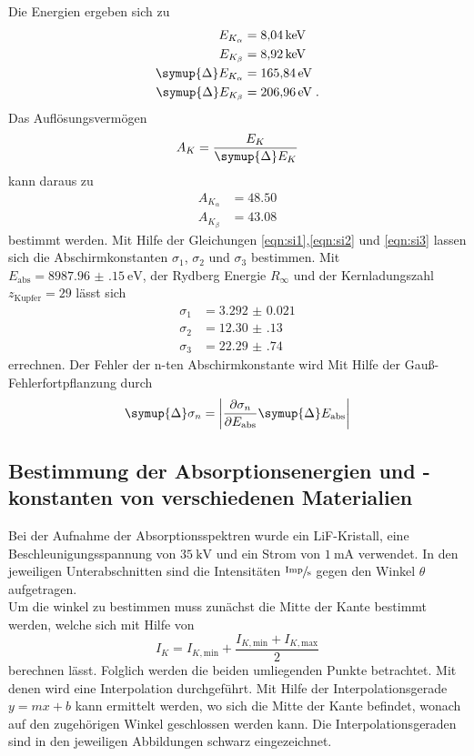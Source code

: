 Die Energien ergeben sich zu 
\begin{align*}
    E_{K_\alpha} & =  \SI{8.04}{\kilo\electronvolt} \\
    E_{K_\beta}  & =  \SI{8.92}{\kilo\electronvolt} \\
    \symup{\Delta}E_{K_\alpha} &= \SI{165.84}{\electronvolt} \\
    \symup{\Delta}E_{K_\beta}  &= \SI{206.96}{\electronvolt} \; \text{.}
\end{align*}
Das Auflösungsvermögen 
\begin{equation}
    A_K = \frac{E_K}{\symup{\Delta}E_K}
\end{equation}
kann daraus zu 
\begin{align*}
    A_{K_\alpha}&= \num{48.50} \\
    A_{K_\beta} &= \num{43.08}
\end{align*}
bestimmt werden.
Mit Hilfe der Gleichungen \eqref{eqn:si1},\eqref{eqn:si2} und \eqref{eqn:si3} lassen sich die Abschirmkonstanten $\sigma_1$, $\sigma_2$ und $\sigma_3$ bestimmen.
Mit $E_\text{abs} = \SI{8987.96(15)}{\electronvolt}$\cite{eabs}, der Rydberg Energie $R_\infty$ und der Kernladungszahl
$z_\text{Kupfer} = 29 $ lässt sich
\begin{align*}
    \sigma_1 &= \num{3.292(21)}  \\
    \sigma_2 &= \num{12.30(13)}  \\
    \sigma_3 &= \num{22.29(74)}
\end{align*}
errechnen.
Der Fehler der n-ten Abschirmkonstante wird Mit Hilfe der Gauß-Fehlerfortpflanzung durch
\begin{equation}
    \symup{\Delta} \sigma_n = \left | \frac{\partial \sigma_n}{\partial E_\text{abs} } \symup{\Delta} E_\text{abs} \right | 
\end{equation} 
\subsection{Bestimmung der Absorptionsenergien und -konstanten von verschiedenen Materialien}
Bei der Aufnahme der Absorptionsspektren wurde ein LiF-Kristall, eine Beschleunigungsspannung von $\SI{35}{\kilo\volt}$ und ein Strom von $\SI{1}{\milli\ampere}$
verwendet. 
In den jeweiligen Unterabschnitten sind die Intensitäten $\sfrac{\text{Imp}}{\si{\second}}$ gegen den Winkel $\theta$ aufgetragen. \\
Um die winkel zu bestimmen muss zunächst die Mitte der Kante bestimmt werden, welche sich mit Hilfe von
\begin{equation}
    I_K = I_{K, \text{min}} + \frac{I_{K, \text{min}} + I_{K, \text{max}}}{2}
\end{equation}
berechnen lässt. 
Folglich werden die beiden umliegenden Punkte betrachtet. 
Mit denen wird eine Interpolation durchgeführt. 
Mit Hilfe der Interpolationsgerade $y = mx+b$ kann ermittelt werden, wo sich die Mitte der Kante befindet, wonach auf den zugehörigen Winkel 
geschlossen werden kann.
Die Interpolationsgeraden sind in den jeweiligen Abbildungen schwarz eingezeichnet. 
